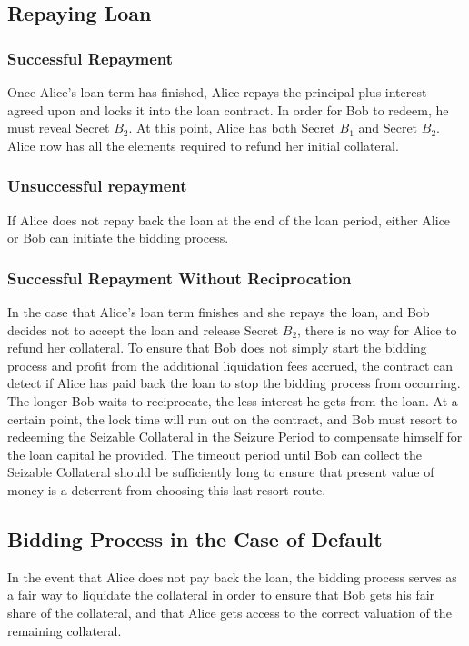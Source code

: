\documentclass{llncs}
\begin{document}
\subsection{Repaying Loan}
\subsubsection{Successful Repayment}
Once Alice’s loan term has finished, Alice repays the principal plus interest agreed upon and locks it into the loan contract. In order for Bob to redeem, he must reveal Secret $B_2$. At this point, Alice has both Secret $B_1$ and Secret $B_2$. Alice now has all the elements required to refund her initial collateral. 

\subsubsection{Unsuccessful repayment}
If Alice does not repay back the loan at the end of the loan period, either Alice or Bob can initiate the bidding process. 
\subsubsection{Successful Repayment Without Reciprocation}
In the case that Alice's loan term finishes and she repays the loan, and Bob decides not to accept the loan and release Secret $B_2$, there is no way for Alice to refund her collateral. To ensure that Bob does not simply start the bidding process and profit from the additional liquidation fees accrued, the contract can detect if Alice has paid back the loan to stop the bidding process from occurring. The longer Bob waits to reciprocate, the less interest he gets from the loan. At a certain point, the lock time will run out on the contract, and Bob must resort to redeeming the Seizable Collateral in the Seizure Period to compensate himself for the loan capital he provided. The timeout period until Bob can collect the Seizable Collateral should be sufficiently long to ensure that present value of money is a deterrent from choosing this last resort route.

\subsection{Bidding Process in the Case of Default} \label{ssec:5:5}
In the event that Alice does not pay back the loan, the bidding process serves as a fair way to liquidate the collateral in order to ensure that Bob gets his fair share of the collateral, and that Alice gets access to the correct valuation of the remaining collateral. 
\end{document}
